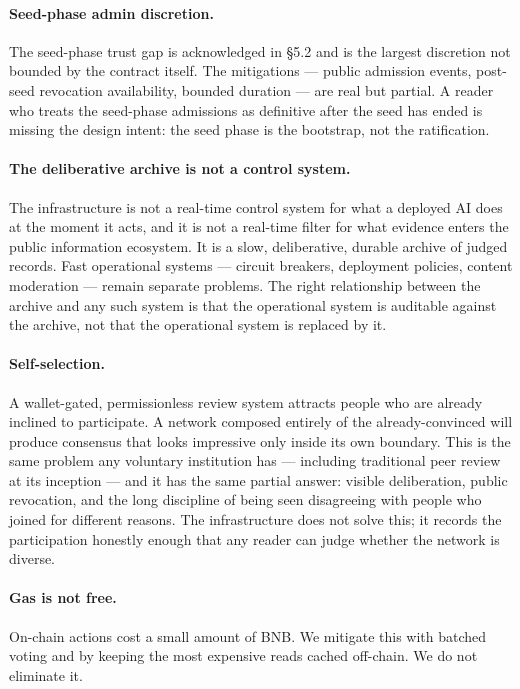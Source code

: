 \documentclass[11pt,a4paper]{article}
\begin{document}
\paragraph{Seed-phase admin discretion.} The seed-phase trust
gap is acknowledged in \S5.2 and is the largest discretion
not bounded by the contract itself. The mitigations --- public
admission events, post-seed revocation availability, bounded
duration --- are real but partial. A reader who treats the
seed-phase admissions as definitive after the seed has ended
is missing the design intent: the seed phase is the bootstrap,
not the ratification.

\paragraph{The deliberative archive is not a control system.}
The infrastructure is not a real-time control system for what a
deployed AI does at the moment it acts, and it is not a
real-time filter for what evidence enters the public
information ecosystem. It is a slow, deliberative, durable
archive of judged records. Fast operational systems --- circuit
breakers, deployment policies, content moderation --- remain
separate problems. The right relationship between the
archive and any such system is that the operational system is
auditable against the archive, not that the operational system
is replaced by it.

\paragraph{Self-selection.} A wallet-gated, permissionless
review system attracts people who are already inclined to
participate. A network composed entirely of the
already-convinced will produce consensus that looks impressive
only inside its own boundary. This is the same problem any
voluntary institution has --- including traditional peer review
at its inception --- and it has the same partial answer:
visible deliberation, public revocation, and the long
discipline of being seen disagreeing with people who joined
for different reasons. The infrastructure does not solve this;
it records the participation honestly enough that any reader
can judge whether the network is diverse.

\paragraph{Gas is not free.} On-chain actions cost a small
amount of BNB. We mitigate this with batched voting and by
keeping the most expensive reads cached off-chain. We do not
eliminate it.
\end{document}
